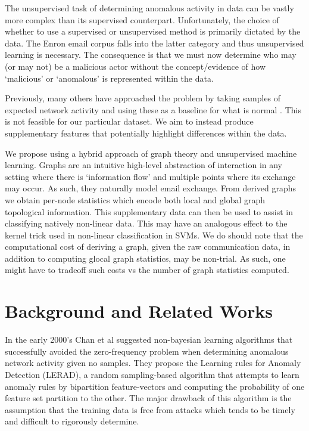 \documentclass[11pt,letterpaper]{article}
\begin{document}
The unsupervised task of determining anomalous activity in data can be vastly more
complex than its supervised counterpart. Unfortunately, the choice of whether to use
a supervised or unsupervised method is primarily dictated by the data. The Enron email
corpus falls into the latter category and thus unsupervised learning is necessary.
The consequence is that we must now determine who may (or may not) be a malicious
actor without the concept/evidence of how `malicious' or `anomalous' is represented within
the data.

Previously, many others have approached the problem by taking
samples of expected network activity and using these as a baseline for what is
normal \cite{chan2003machine,stein2005decision}. This is not feasible for our
particular dataset. We aim to instead produce supplementary features that potentially
highlight differences within the data.

We propose using a hybrid approach of graph theory and unsupervised machine learning.
Graphs are an intuitive high-level abstraction of interaction in any setting where
there is `information flow' and multiple points where its exchange may occur. As 
such, they naturally model email exchange. From derived graphs we obtain per-node
statistics which encode both local and global graph topological information. This
supplementary data can then be used to assist in classifying natively non-linear data.
This may have an analogous effect to the kernel trick used in non-linear 
classification in SVMs. %
We do should note that the computational cost of deriving a graph, given the
raw communication data, in addition to computing glocal graph statistics, may
be non-trial. As such, one might have to tradeoff such costs vs the number of graph
statistics computed.

\section{Background and Related Works}
In the early 2000's Chan et al \cite{chan2003machine} suggested non-bayesian 
learning algorithms that successfully avoided the zero-frequency problem when determining
anomalous network activity given no samples. They propose the Learning rules for Anomaly
Detection (LERAD), a random sampling-based algorithm that attempts to learn anomaly
rules by bipartition feature-vectors and computing the probability of one feature set
partition to the other. The major drawback of this algorithm is the assumption that the 
training data is free from attacks which tends to be timely and difficult to rigorously
determine.
\end{document}
